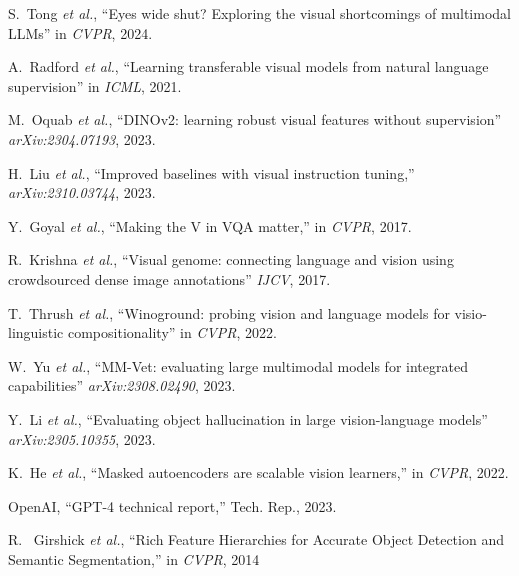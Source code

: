 \documentclass[11pt]{article}
\begin{document}
\begin{small}
\begin{thebibliography}{9}
    \setlength{\itemsep}{0.1em}  
    \setlength{\parskip}{0pt}     

        S.~Tong \emph{et al.},
        ``Eyes wide shut? Exploring the visual shortcomings of multimodal LLMs''
        in \emph{CVPR}, 2024.
        
        A.~Radford \emph{et al.},
        ``Learning transferable visual models from natural language supervision''
        in \emph{ICML}, 2021.

        M.~Oquab \emph{et al.},
        ``DINOv2: learning robust visual features without supervision''
        \emph{arXiv:2304.07193}, 2023.

        H.~Liu \emph{et al.},
        ``Improved baselines with visual instruction tuning,''
        \emph{arXiv:2310.03744}, 2023.

        Y.~Goyal \emph{et al.},
        ``Making the V in VQA matter,''
        in \emph{CVPR}, 2017.

        R.~Krishna \emph{et al.},
        ``Visual genome: connecting language and vision using crowdsourced dense image annotations''
        \emph{IJCV}, 2017.

        T.~Thrush \emph{et al.},
        ``Winoground: probing vision and language models for visio-linguistic compositionality''
        in \emph{CVPR}, 2022.

        W.~Yu \emph{et al.},
        ``MM-Vet: evaluating large multimodal models for integrated capabilities''
        \emph{arXiv:2308.02490}, 2023.

        Y.~Li \emph{et al.},
        ``Evaluating object hallucination in large vision-language models''
        \emph{arXiv:2305.10355}, 2023.
            
        K.~He \emph{et al.},
        ``Masked autoencoders are scalable vision learners,''
        in \emph{CVPR}, 2022.
        
        OpenAI,
        ``GPT-4 technical report,''
        Tech. Rep., 2023.

        R. ~Girshick \emph{et al.},
        ``Rich Feature Hierarchies for Accurate Object Detection and Semantic Segmentation,''
        in \emph{CVPR}, 2014
        
\end{thebibliography}
\end{small}
    
\end{document}
